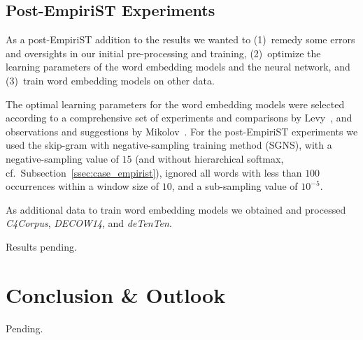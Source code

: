 \documentclass[11pt]{article}
\begin{document}
\subsection{Post-EmpiriST Experiments}
\label{ssec:case_postempirist}
As a post-EmpiriST addition to the results we wanted to (1)~remedy some errors and oversights in our initial pre-processing and training, (2)~optimize the learning parameters of the word embedding models and the neural network, and (3)~train word embedding models on other data.

The optimal learning parameters for the word embedding models were selected according to a comprehensive set of experiments and comparisons by Levy~, and observations and suggestions by Mikolov~. For the post-EmpiriST experiments we used the skip-gram with negative-sampling training method (SGNS), with a negative-sampling value of $15$ (and without hierarchical softmax, cf.~Subsection~\ref{ssec:case_empirist}), ignored all words with less than $100$ occurrences within a window size of $10$, and a sub-sampling value of $10^{-5}$. 

As additional data to train word embedding models we obtained and processed \emph{C4Corpus}, \emph{DECOW14}, and \emph{deTenTen}.

\fxnote[inline]{}Results pending.


\section{Conclusion \& Outlook}
\label{sec:conclusion}

\fxnote[inline]{}Pending.


\clearpage
%
%



\end{document}
